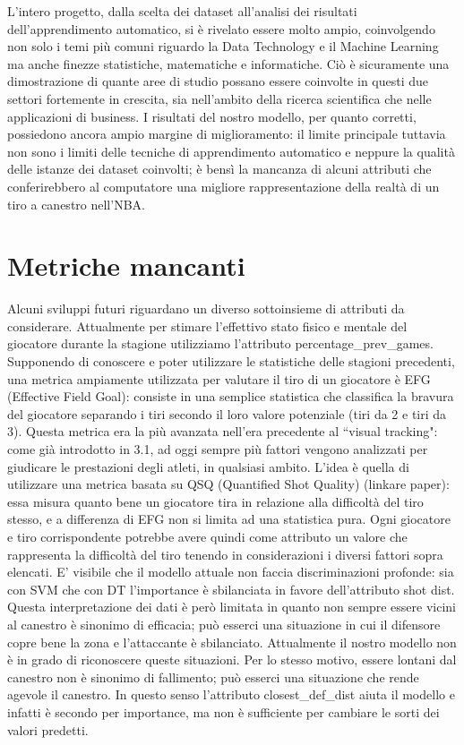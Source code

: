 L'intero progetto, dalla scelta dei dataset all'analisi dei risultati dell'apprendimento automatico, si è rivelato essere molto ampio, coinvolgendo non solo i temi più comuni riguardo la Data Technology e il Machine Learning ma anche finezze statistiche, matematiche e informatiche. Ciò è sicuramente una dimostrazione di quante aree di studio possano essere coinvolte in questi due settori fortemente in crescita, sia nell'ambito della ricerca scientifica che nelle applicazioni di business.
I risultati del nostro modello, per quanto corretti, possiedono ancora ampio margine di miglioramento: il limite principale tuttavia non sono i limiti delle tecniche di apprendimento automatico e neppure la qualità delle istanze dei dataset coinvolti; è bensì la mancanza di alcuni attributi che conferirebbero al computatore una migliore rappresentazione della realtà di un tiro a canestro nell'NBA.
\section{Metriche mancanti}
Alcuni sviluppi futuri riguardano un diverso sottoinsieme di attributi da considerare.
Attualmente per stimare l'effettivo stato fisico e mentale del giocatore durante la stagione utilizziamo l'attributo percentage\_prev\_games. Supponendo di conoscere e poter utilizzare le statistiche delle stagioni precedenti, una metrica ampiamente utilizzata per valutare il tiro di un giocatore è EFG (Effective Field Goal): consiste in una semplice statistica che classifica la bravura del giocatore separando i tiri secondo il loro valore potenziale (tiri da 2 e tiri da 3).
Questa metrica era la più avanzata nell'era precedente al “visual tracking": come già introdotto in 3.1, ad oggi sempre più fattori vengono analizzati per giudicare le prestazioni degli atleti, in qualsiasi ambito.
L'idea è quella di utilizzare una metrica basata su QSQ (Quantified Shot Quality) (linkare paper): essa misura quanto bene un giocatore tira in relazione alla difficoltà del tiro stesso, e a differenza di EFG non si limita ad una statistica pura.
Ogni giocatore e tiro corrispondente potrebbe avere quindi come attributo un valore che rappresenta la difficoltà del tiro tenendo in considerazioni i diversi fattori sopra elencati.
E' visibile che il modello attuale non faccia discriminazioni profonde: sia con SVM che con DT l'importance è sbilanciata in favore dell'attributo shot dist. Questa interpretazione dei dati è però limitata in quanto non sempre essere vicini al canestro è sinonimo di efficacia; può esserci una situazione in cui il difensore copre bene la zona e l'attaccante è sbilanciato. Attualmente il nostro modello non è in grado di riconoscere queste situazioni. Per lo stesso motivo, essere lontani dal canestro non è sinonimo di fallimento; può esserci una situazione che rende agevole il canestro.
In questo senso l'attributo closest\_def\_dist aiuta il modello e infatti è secondo per importance, ma non è sufficiente per cambiare le sorti dei valori predetti.


